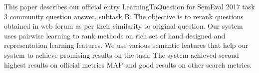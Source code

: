 This paper describes our official entry LearningToQuestion for SemEval 2017 task 3 community question answer, subtask B. The objective is to rerank questions obtained in web forum as per their similarity to original question. Our system uses pairwise learning to rank methods on rich set of hand designed and representation learning features. We use various semantic features that help our system to achieve promising results on the task. The system achieved second highest results on official metrics MAP and good results on other search metrics.
